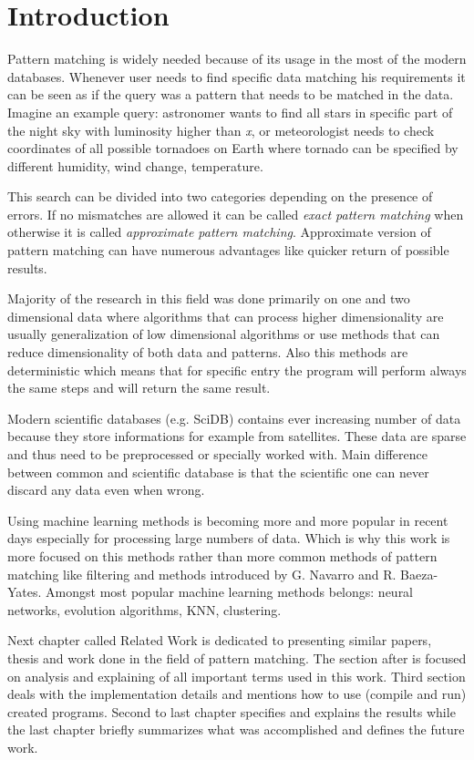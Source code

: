 
\chapter{Introduction}
Pattern matching is widely needed because of its usage in the most of the modern databases. Whenever user needs to find specific data matching his requirements it can be seen as if the query was a pattern that needs to be matched in the data. Imagine an example query: astronomer wants to find all stars in specific part of the night sky with luminosity higher than \textit{x}, or meteorologist needs to check coordinates of all possible tornadoes on Earth where tornado can be specified by different humidity, wind change, temperature. \cite{detectRivers}

This search can be divided into two categories depending on the presence of errors. If no mismatches are allowed it can be called \textit{exact pattern matching} when otherwise it is called \textit{approximate pattern matching}. Approximate version of pattern matching can have numerous advantages like quicker return of possible results. 

Majority of the research in this field was done primarily on one and two dimensional data where algorithms that can process higher dimensionality are usually generalization of low dimensional algorithms or use methods that can reduce dimensionality of both data and patterns. Also this methods are deterministic which means that for specific entry the program will perform always the same steps and will return the same result.

Modern scientific databases (e.g. SciDB) contains ever increasing number of data because they store informations for example from satellites. These data are sparse and thus need to be preprocessed or specially worked with. Main difference between common and scientific database is that the scientific one can never discard any data even when wrong.

Using machine learning methods is becoming more and more popular in recent days especially for processing large numbers of data. Which is why this work is more focused on this methods rather than more common methods of pattern matching like filtering and methods introduced by G. Navarro and R. Baeza-Yates. Amongst most popular machine learning methods belongs: neural networks, evolution algorithms, KNN, clustering.

Next chapter called Related Work is dedicated to presenting similar papers, thesis and work done in the field of pattern matching. The section after is focused on analysis and explaining of all important terms used in this work. Third section deals with the implementation details and mentions how to use (compile and run) created programs. Second to last chapter specifies and explains the results while the last chapter briefly summarizes what was accomplished and defines the future work.
